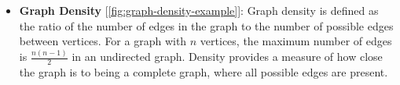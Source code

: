 \documentclass[../Thesis.tex]{subfiles}
\begin{document}
\begin{itemize}
		\item \textbf{Graph Density} [\autoref{fig:graph-density-example}]: Graph density is defined as the ratio of the number of edges in the graph to the number of possible edges between vertices. For a graph with \( n \) vertices, the maximum number of edges is \( \frac{n(n-1)}{2} \) in an undirected graph. Density provides a measure of how close the graph is to being a complete graph, where all possible edges are present.
		
		
	\end{itemize}
	
\end{document}
